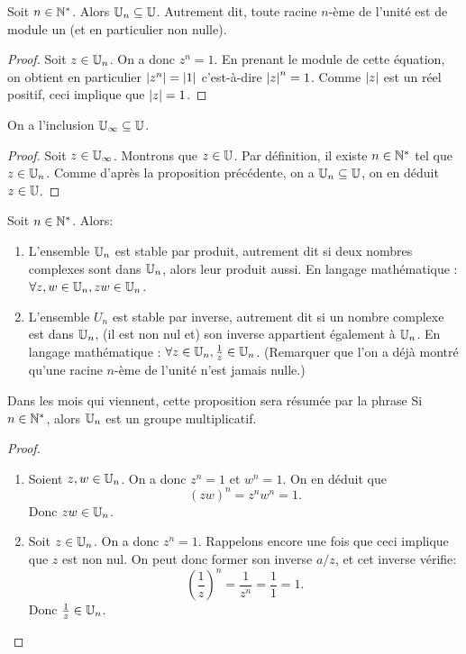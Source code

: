 \begin{proposition}
Soit $n\in\mathbb{N}^*$. Alors $\mathbb{U}_n \subseteq \mathbb{U}$. Autrement dit, toute racine $n$-ème de l'unité est de module un (et en particulier non nulle).
\end{proposition}
\begin{proof}
Soit $z\in\mathbb{U}_n$. On a donc $z^n=1$. En prenant le module de cette équation, on obtient en particulier $\left\lvert z^n\right\rvert=\left\lvert1\right\rvert$ c'est-à-dire $\left\lvert z\right\rvert^n=1$. Comme $\left\lvert z\right\rvert$ est un réel positif, ceci implique que $\left\lvert z\right\rvert=1$.
\end{proof}

\begin{corollaire}
On a l'inclusion $\mathbb{U}_\infty\subseteq\mathbb{U}$.
\end{corollaire}
\begin{proof}
Soit $z\in \mathbb{U}_\infty$. Montrons que $z\in\mathbb{U}$. Par définition, il existe $n\in\mathbb{N}^*$ tel que $z\in\mathbb{U}_n$. Comme d'après la proposition précédente, on a $\mathbb{U}_n\subseteq \mathbb{U}$, on en déduit $z\in\mathbb{U}$. 
\end{proof}

\begin{proposition}
Soit $n\in\mathbb{N}^*$. Alors:
\begin{enumerate}
\item L'ensemble $\mathbb{U}_n$ est stable par produit, autrement dit si deux nombres complexes sont dans $\mathbb{U}_n$, alors leur produit aussi. En langage mathématique : $\forall z, w\in\mathbb{U}_n, zw\in\mathbb{U}_n$.
\item L'ensemble $U_n$ est stable par inverse, autrement dit si un nombre complexe est dans $\mathbb{U}_n$, (il est non nul et) son inverse appartient également à $\mathbb{U}_n$. En langage mathématique : $\forall z\in\mathbb{U}_n, \frac{1}{z} \in\mathbb{U}_n$. (Remarquer que l'on a déjà montré qu'une racine $n$-ème de l'unité n'est jamais nulle.)
\end{enumerate}
\end{proposition}
\begin{remarque}
Dans les mois qui viennent, cette proposition sera résumée par la phrase \og Si $n\in\mathbb{N}^*$, alors $\mathbb{U}_n$ est un groupe multiplicatif.\fg
\end{remarque}

\begin{proof}
\begin{enumerate}
\item Soient $z, w\in\mathbb{U}_n$. On a donc $z^n=1$ et $w^n=1$. On en déduit que 
\[ (zw)^n=z^nw^n=1.\]
Donc $zw\in\mathbb{U}_n$.
\item Soit $z\in\mathbb{U}_n$. On a donc $z^n=1$. Rappelons encore une fois que ceci implique que $z$ est non nul. On peut donc former son inverse $a/z$, et cet inverse vérifie:
\[ \left(\frac{1}{z}\right)^n = \frac{1}{z^n} = \frac{1}{1} = 1.\]
Donc $\frac{1}{z} \in\mathbb{U}_n$.
\end{enumerate}
\end{proof}

